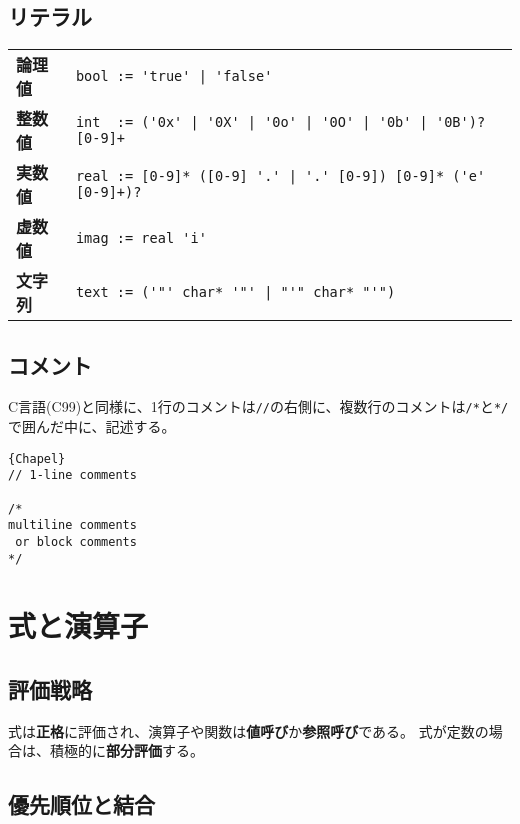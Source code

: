 \documentclass[10pt,a4paper]{book}
\begin{document}
\section{リテラル}

\begin{table}[h]
\raggedright
\begin{tabular}{ll}
\textbf{論理値} & \verb#bool := 'true' | 'false'# \\
\textbf{整数値} & \verb#int  := ('0x' | '0X' | '0o' | '0O' | '0b' | '0B')? [0-9]+# \\
\textbf{実数値} & \verb#real := [0-9]* ([0-9] '.' | '.' [0-9]) [0-9]* ('e' [0-9]+)?# \\
\textbf{虚数値} & \verb#imag := real 'i'# \\
\textbf{文字列} & \verb#text := ('"' char* '"' | "'" char* "'")#
\end{tabular}
\end{table}

\section{コメント}

C言語(C99)と同様に、1行のコメントは\verb#//#の右側に、複数行のコメントは\verb#/*#と\verb#*/#で囲んだ中に、記述する。

\begin{Verbatim}{Chapel}
// 1-line comments

/*
multiline comments
 or block comments
*/
\end{Verbatim}

\chapter{式と演算子}

\section{評価戦略}

式は\textbf{正格}に評価され、演算子や関数は\textbf{値呼び}か\textbf{参照呼び}である。
式が定数の場合は、積極的に\textbf{部分評価}する。

\section{優先順位と結合}
\end{document}
